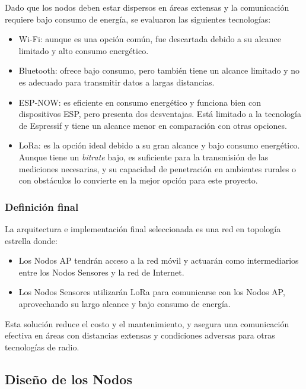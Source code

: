 Dado que los nodos deben estar dispersos en áreas extensas y la comunicación requiere bajo consumo de energía, se evaluaron las siguientes tecnologías:
\begin{itemize}
    \item Wi-Fi: aunque es una opción común, fue descartada debido a su alcance limitado y alto consumo energético.

    \item Bluetooth: ofrece bajo consumo, pero también tiene un alcance limitado y no es adecuado para transmitir datos a largas distancias.
    
    \item ESP-NOW: es eficiente en consumo energético y funciona bien con dispositivos ESP, pero presenta dos desventajas. Está limitado a la tecnología de Espressif y tiene un alcance menor en comparación con otras opciones.

    \item LoRa: es la opción ideal debido a su gran alcance y bajo consumo energético. Aunque tiene un \textit{bitrate} bajo, es suficiente para la transmisión de las mediciones necesarias, y su capacidad de penetración en ambientes rurales o con obstáculos lo convierte en la mejor opción para este proyecto.
    
\end{itemize}

\subsubsection{Definición final}

La arquitectura e implementación final seleccionada es una red en topología estrella donde:

\begin{itemize}
    \item Los Nodos AP tendrán acceso a la red móvil y actuarán como intermediarios entre los Nodos Sensores y la red de Internet.
    \item Los Nodos Sensores utilizarán LoRa para comunicarse con los Nodos AP, aprovechando su largo alcance y bajo consumo de energía.
\end{itemize}

Esta solución reduce el costo y el mantenimiento, y asegura una comunicación efectiva en áreas con distancias extensas y condiciones adversas para otras tecnologías de radio.

\subsection{Diseño de los Nodos}

